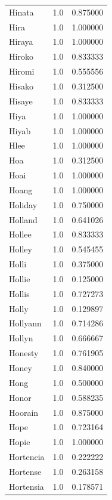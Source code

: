 \documentclass[
  letterpaper,
  DIV=11,
  numbers=noendperiod]{scrreprt}
\begin{document}
\begin{tabular}{lrr}
Hinata          &   1.0 &   0.875000 \\
Hira            &   1.0 &   1.000000 \\
Hiraya          &   1.0 &   1.000000 \\
Hiroko          &   1.0 &   0.833333 \\
Hiromi          &   1.0 &   0.555556 \\
Hisako          &   1.0 &   0.312500 \\
Hisaye          &   1.0 &   0.833333 \\
Hiya            &   1.0 &   1.000000 \\
Hiyab           &   1.0 &   1.000000 \\
Hlee            &   1.0 &   1.000000 \\
Hoa             &   1.0 &   0.312500 \\
Hoai            &   1.0 &   1.000000 \\
Hoang           &   1.0 &   1.000000 \\
Holiday         &   1.0 &   0.750000 \\
Holland         &   1.0 &   0.641026 \\
Hollee          &   1.0 &   0.833333 \\
Holley          &   1.0 &   0.545455 \\
Holli           &   1.0 &   0.375000 \\
Hollie          &   1.0 &   0.125000 \\
Hollis          &   1.0 &   0.727273 \\
Holly           &   1.0 &   0.129897 \\
Hollyann        &   1.0 &   0.714286 \\
Hollyn          &   1.0 &   0.666667 \\
Honesty         &   1.0 &   0.761905 \\
Honey           &   1.0 &   0.840000 \\
Hong            &   1.0 &   0.500000 \\
Honor           &   1.0 &   0.588235 \\
Hoorain         &   1.0 &   0.875000 \\
Hope            &   1.0 &   0.723164 \\
Hopie           &   1.0 &   1.000000 \\
Hortencia       &   1.0 &   0.222222 \\
Hortense        &   1.0 &   0.263158 \\
Hortensia       &   1.0 &   0.178571 \\

\end{tabular}
\end{document}

